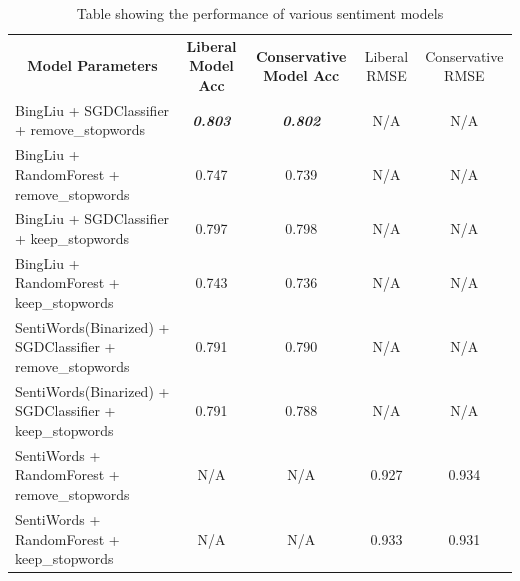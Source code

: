 \documentclass[conference]{IEEEtran}
\begin{document}
\begin{table}[tb]
  \footnotesize
  \centering
    \caption{Table showing the performance of various sentiment models} 
  \label{Tab:EmbeddingsTab1}
  \vspace{-2mm}
  \begin{tabular}{lcccc}
    \multicolumn{1}{c}{\textbf{Model Parameters}}             
    & \textbf{Liberal Model Acc} & \textbf{Conservative Model Acc} & Liberal RMSE & Conservative RMSE \\
    BingLiu + SGDClassifier + remove\_stopwords               & \textit{\textbf{0.803}}    & \textit{\textbf{0.802}}         & N/A          & N/A               \\
    BingLiu + RandomForest + remove\_stopwords                & 0.747                      & 0.739                           & N/A          & N/A               \\
    BingLiu + SGDClassifier + keep\_stopwords                 & 0.797                      & 0.798                           & N/A          & N/A               \\
    BingLiu + RandomForest + keep\_stopwords                  & 0.743                      & 0.736                           & N/A          & N/A               \\
    SentiWords(Binarized) + SGDClassifier + remove\_stopwords & 0.791                      & 0.790                           & N/A          & N/A               \\
    SentiWords(Binarized) + SGDClassifier + keep\_stopwords   & 0.791                      & 0.788                           & N/A          & N/A               \\
    SentiWords + RandomForest + remove\_stopwords             & N/A                        & N/A                             & 0.927        & 0.934             \\
    SentiWords + RandomForest + keep\_stopwords               & N/A                        & N/A                             & 0.933        & 0.931            
\end{tabular}
\vspace{-7mm}
\end{table}
\end{document}
